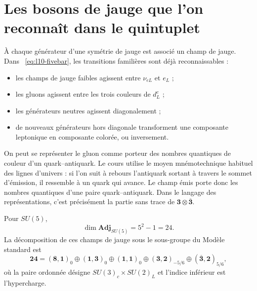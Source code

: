 \begin{classroomqa}
\end{classroomqa}

\section{Les bosons de jauge que l’on reconnaît dans le quintuplet}

À chaque générateur d’une symétrie de jauge est associé un champ de jauge. Dans ~\eqref{eq:l10-fivebar}, les transitions familières sont déjà reconnaissables :
\begin{itemize}
\item les champs de jauge faibles agissent entre \(\nu_{eL}\) et \(e_L\) ;
\item les gluons agissent entre les trois couleurs de \(d^c_L\) ;
\item les générateurs neutres agissent diagonalement ;
\item de nouveaux générateurs hors diagonale transforment une composante leptonique en composante colorée, ou inversement.
\end{itemize}

On peut se représenter le gluon comme porteur des nombres quantiques de couleur d’un quark--antiquark. Le cours utilise le moyen mnémotechnique habituel des lignes d’univers : si l’on suit à rebours l’antiquark sortant à travers le sommet d’émission, il ressemble à un quark qui avance. Le champ émis porte donc les nombres quantiques d’une paire quark--antiquark. Dans le langage des représentations, c’est précisément la partie sans trace de \(\mathbf3\otimes\overline{\mathbf3}\).

Pour \(SU(5)\),
\begin{equation}
\dim\mathbf{Adj}_{SU(5)}=5^2-1=24.
\end{equation}
La décomposition de ces champs de jauge sous le sous-groupe du Modèle standard est
\begin{equation}
\mathbf{24}
=
(\mathbf8,\mathbf1)_0
\oplus(\mathbf1,\mathbf3)_0
\oplus(\mathbf1,\mathbf1)_0
\oplus(\mathbf3,\mathbf2)_{-5/6}
\oplus(\overline{\mathbf3},\mathbf2)_{5/6},
\label{eq:l10-adjoint-sm}
\end{equation}
où la paire ordonnée désigne \(SU(3)_c\times SU(2)_L\) et l’indice inférieur est l’hypercharge.

